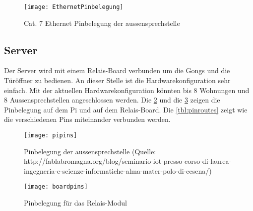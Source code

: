 \begin{figure}[htb!]
	\begin{center}
		\texttt{[image: EthernetPinbelegung]}
		\caption[EthernetPinbelegung]{Cat. 7 Ethernet Pinbelegung der \gls{aussensprechstelle}}
		\label{fig:ethernetBelegung}
	\end{center}
\end{figure}



\subsection{Server}
\label{sec:chapterexample}
Der Server wird mit einem Relais-Board verbunden um die Gongs und die Türöffner zu bedienen. An dieser Stelle ist die Hardwarekonfiguration sehr einfach. Mit der aktuellen Hardwarekonfiguration könnten bis 8 Wohnungen und 8 Aussensprechstellen angeschlossen werden. Die \cref{fig:pipins} und die \cref{fig:boardpins} zeigen die Pinbelegung auf dem Pi und auf dem Relais-Board. Die \cref{tbl:pinroutes} zeigt wie die verschiedenen Pins miteinander verbunden werden.

\begin{figure}[htb!]
	\begin{center}
		\texttt{[image: pipins]}
		\caption[EthernetPinbelegung]{Pinbelegung der \gls{aussensprechstelle} (Quelle: http://fablabromagna.org/blog/seminario-iot-presso-corso-di-laurea-ingegneria-e-scienze-informatiche-alma-mater-polo-di-cesena/)}
		\label{fig:pipins}
	\end{center}
\end{figure}

\begin{figure}[htb!]
	\begin{center}
		\texttt{[image: boardpins]}
		\caption[EthernetPinbelegung]{Pinbelegung für das Relais-Modul}
		\label{fig:boardpins}
	\end{center}
\end{figure}

